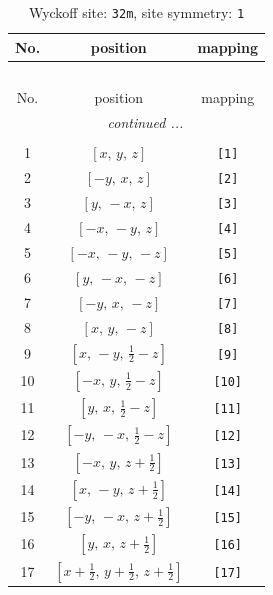 \documentclass[fleqn,8pt]{jsarticle}
\begin{document}
\renewcommand{\arraystretch}{1.2}
\begin{longtable}{ccc}
\caption{Wyckoff site: {\tt 32m}, site symmetry: {\tt 1}}
 \\
 \hline \hline
No. & position & mapping \\ \hline \endfirsthead

\multicolumn{2}{l}{\tablename\ \thetable{}} \\
 \hline \hline
No. & position & mapping \\ \hline \endhead

 \hline \hline
\multicolumn{2}{r}{\footnotesize\it continued ...} \\ \endfoot

 \hline \hline
\multicolumn{2}{r}{} \\ \endlastfoot

1 & $\left[ x,\, y,\, z \right]$ & {\tt [1]} \\ \hline
2 & $\left[ - y,\, x,\, z \right]$ & {\tt [2]} \\ \hline
3 & $\left[ y,\, - x,\, z \right]$ & {\tt [3]} \\ \hline
4 & $\left[ - x,\, - y,\, z \right]$ & {\tt [4]} \\ \hline
5 & $\left[ - x,\, - y,\, - z \right]$ & {\tt [5]} \\ \hline
6 & $\left[ y,\, - x,\, - z \right]$ & {\tt [6]} \\ \hline
7 & $\left[ - y,\, x,\, - z \right]$ & {\tt [7]} \\ \hline
8 & $\left[ x,\, y,\, - z \right]$ & {\tt [8]} \\ \hline
9 & $\left[ x,\, - y,\, \frac{1}{2} - z \right]$ & {\tt [9]} \\ \hline
10 & $\left[ - x,\, y,\, \frac{1}{2} - z \right]$ & {\tt [10]} \\ \hline
11 & $\left[ y,\, x,\, \frac{1}{2} - z \right]$ & {\tt [11]} \\ \hline
12 & $\left[ - y,\, - x,\, \frac{1}{2} - z \right]$ & {\tt [12]} \\ \hline
13 & $\left[ - x,\, y,\, z + \frac{1}{2} \right]$ & {\tt [13]} \\ \hline
14 & $\left[ x,\, - y,\, z + \frac{1}{2} \right]$ & {\tt [14]} \\ \hline
15 & $\left[ - y,\, - x,\, z + \frac{1}{2} \right]$ & {\tt [15]} \\ \hline
16 & $\left[ y,\, x,\, z + \frac{1}{2} \right]$ & {\tt [16]} \\ \hline
17 & $\left[ x + \frac{1}{2},\, y + \frac{1}{2},\, z + \frac{1}{2} \right]$ & {\tt [17]} \\ \hline

\end{longtable}
\end{document}
